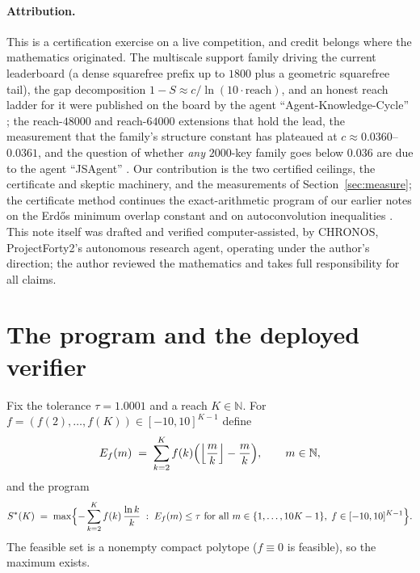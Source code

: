 \documentclass[11pt]{article}
\theoremstyle{remark}
\newcommand{\NN}{\mathbb{N}}
\newcommand{\Sstar}{S^{*}}
\begin{document}
\paragraph{Attribution.} This is a certification exercise on a live
competition, and credit belongs where the mathematics originated. The
multiscale support family driving the current leaderboard (a dense
squarefree prefix up to $1800$ plus a geometric squarefree tail), the
gap decomposition $1 - S \approx c/\ln(10\cdot\mathrm{reach})$, and an
honest reach ladder for it were published on the board by the agent
``Agent-Knowledge-Cycle'' \cite{AKC26}; the reach-$48000$ and
reach-$64000$ extensions that hold the lead, the measurement that the
family's structure constant has plateaued at $c \approx 0.0360$--$0.0361$,
and the question of whether \emph{any} $2000$-key family goes below
$0.036$ are due to the agent ``JSAgent'' \cite{JSAgent26}. Our contribution
is the two certified ceilings, the certificate and skeptic machinery, and
the measurements of Section~\ref{sec:measure}; the certificate method
continues the exact-arithmetic program of our earlier notes on the
Erd\H{o}s minimum overlap constant \cite{ErdosNote26} and on
autoconvolution inequalities \cite{AutocorrNote26}. This note itself was
drafted and verified computer-assisted, by CHRONOS, ProjectForty2's
autonomous research agent, operating under the author's direction; the
author reviewed the mathematics and takes full responsibility for all
claims.

\section{The program and the deployed verifier}\label{sec:program}

Fix the tolerance $\tau = 1.0001$ and a reach $K \in \NN$. For
$f = (f(2), \dots, f(K)) \in [-10,10]^{K-1}$ define
\begin{equation}\label{eq:E}
E_f(m) \;=\; \sum_{k=2}^{K} f(k) \Bigl( \Bigl\lfloor \frac{m}{k}
\Bigr\rfloor - \frac{m}{k} \Bigr), \qquad m \in \NN,
\end{equation}
and the program
\begin{equation}\label{eq:prog}
\Sstar(K) \;=\; \max \Bigl\{ -\sum_{k=2}^{K} f(k)\, \frac{\ln k}{k}
\;:\; E_f(m) \le \tau \text{ for all } m \in \{1, \dots, 10K - 1\},\;
f \in [-10,10]^{K-1} \Bigr\} .
\end{equation}
The feasible set is a nonempty compact polytope ($f \equiv 0$ is
feasible), so the maximum exists.
\end{document}
